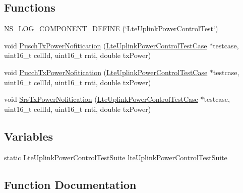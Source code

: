 \subsection*{Functions}
\begin{DoxyCompactItemize}
\item 
\hyperlink{lte-test-uplink-power-control_8cc_ab11dc1f30d7aa19c446b0f6b3dbab4e7}{N\+S\+\_\+\+L\+O\+G\+\_\+\+C\+O\+M\+P\+O\+N\+E\+N\+T\+\_\+\+D\+E\+F\+I\+NE} (\char`\"{}Lte\+Uplink\+Power\+Control\+Test\char`\"{})
\item 
void \hyperlink{lte-test-uplink-power-control_8cc_a2236a3f87ff177b3305bf82ff492f8ad}{Pusch\+Tx\+Power\+Nofitication} (\hyperlink{classLteUplinkPowerControlTestCase}{Lte\+Uplink\+Power\+Control\+Test\+Case} $\ast$testcase, uint16\+\_\+t cell\+Id, uint16\+\_\+t rnti, double tx\+Power)
\item 
void \hyperlink{lte-test-uplink-power-control_8cc_a4a348fa3ab0a4e65de2ddb70fe0176e3}{Pucch\+Tx\+Power\+Nofitication} (\hyperlink{classLteUplinkPowerControlTestCase}{Lte\+Uplink\+Power\+Control\+Test\+Case} $\ast$testcase, uint16\+\_\+t cell\+Id, uint16\+\_\+t rnti, double tx\+Power)
\item 
void \hyperlink{lte-test-uplink-power-control_8cc_acc0b838be35884288e3872794ca2903d}{Srs\+Tx\+Power\+Nofitication} (\hyperlink{classLteUplinkPowerControlTestCase}{Lte\+Uplink\+Power\+Control\+Test\+Case} $\ast$testcase, uint16\+\_\+t cell\+Id, uint16\+\_\+t rnti, double tx\+Power)
\end{DoxyCompactItemize}
\subsection*{Variables}
\begin{DoxyCompactItemize}
\item 
static \hyperlink{classLteUplinkPowerControlTestSuite}{Lte\+Uplink\+Power\+Control\+Test\+Suite} \hyperlink{lte-test-uplink-power-control_8cc_a15d8ede1cce2b40f44096d0f823a9106}{lte\+Uplink\+Power\+Control\+Test\+Suite}
\end{DoxyCompactItemize}


\subsection{Function Documentation}
